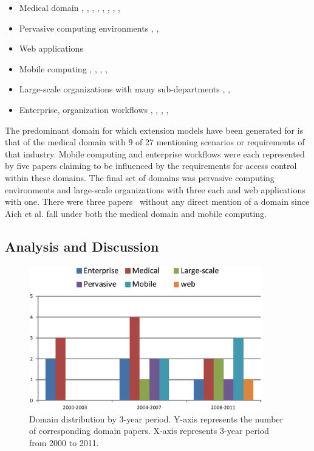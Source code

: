 \begin{itemize}
\setlength{\itemsep}{0.25pt}
\item Medical domain \cite{alam06:constraint}, \cite{tzelepi01:flexible}, \cite{motta03:contextual}, \cite{ni2010privacy}, \cite{damiani2007geo}, \cite{hansen2003spatial}, \cite{samuel07:spatio-temporal}, \cite{aich09:role}, \cite{zhou2007team}
\item Pervasive computing environments \cite{huang06:pervasive}, \cite{chen08:spatio-temporal}, \cite{ray07:spatio}
\item Web applications \cite{masoumzadeh2008purbac}
\item Mobile computing \cite{thein2011leveraging}, \cite{zou2009crbac}, \cite{chandran05:llt}, \cite{ray07:spatio}, \cite{aich09:role}
\item Large-scale organizations with many sub-departments \cite{yamazaki04:designing}, \cite{han08:extended}, \cite{yao2008task}
\item Enterprise, organization workflows \cite{cholewka00:acontext-sensitive}, \cite{bao08:role}, \cite{zhang06:collaborative}, \cite{oh2003task}, \cite{joshi05:generalized}
\end{itemize}

The predominant domain for which extension models have been generated for is that of the medical domain with 9 of 27 mentioning scenarios or requirements of that industry.
Mobile computing and enterprise workflows were each represented by five papers claiming to be influenced by the requirements for access control within these domains. The final set
of domains was pervasive computing environments and large-scale organizations with three each and web applications with one.  There were three papers~\cite{jian2008extended, aich07:STARBAC, haibo2005context} without any direct mention of a domain since Aich et al. \cite{aich09:role} fall under both the medical domain and mobile computing.

\subsection{Analysis and Discussion}

\begin{figure}[ht]
    \centering
        \includegraphics[width=4.0in]{sections/dist_domains_byYear.eps}
\vspace{-0.2 in}
    \caption{\label{fig:dist_domains}Domain distribution by 3-year period. Y-axis represents the number of corresponding domain papers.
    X-axis represents 3-year period from 2000 to 2011.}
\end{figure}



